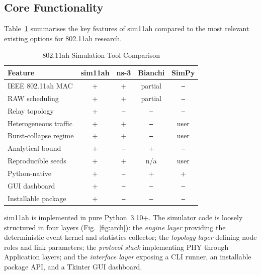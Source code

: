 \documentclass[conference]{IEEEtran}
\begin{document}
\subsection{Core Functionality}

Table~\ref{tab:comparison} summarises the key features of sim11ah compared to
the most relevant existing options for 802.11ah research.

\begin{table}[!t]
\renewcommand{\arraystretch}{1.15}
\caption{802.11ah Simulation Tool Comparison}
\label{tab:comparison}
\centering
\begin{tabular}{@{}lcccc@{}}
\toprule
\textbf{Feature} & \textbf{sim11ah} & \textbf{ns-3} & \textbf{Bianchi} & \textbf{SimPy} \\
\midrule
IEEE 802.11ah MAC    & +       & +       & partial & \texttt{--} \\
RAW scheduling       & +       & +       & partial & \texttt{--} \\
Relay topology       & +       & \texttt{--}      & \texttt{--}      & \texttt{--} \\
Heterogeneous traffic& +       & +       & \texttt{--}      & user \\
Burst-collapse regime& +       & +       & \texttt{--}      & user \\
Analytical bound     & +       & \texttt{--}      & +       & \texttt{--} \\
Reproducible seeds   & +       & +       & n/a     & user \\
Python-native        & +       & \texttt{--}      & +       & + \\
GUI dashboard        & +       & \texttt{--}      & \texttt{--}      & \texttt{--} \\
Installable package  & +       & \texttt{--}      & \texttt{--}      & \texttt{--} \\
\bottomrule
\end{tabular}
\end{table}

sim11ah is implemented in pure Python~3.10+.
The simulator code is loosely structured in four layers (Fig.~\ref{fig:arch}):
the \emph{engine layer} providing the deterministic event kernel and
statistics collector; the \emph{topology layer} defining node roles and link
parameters; the \emph{protocol stack} implementing PHY through Application
layers; and the \emph{interface layer} exposing a CLI runner, an installable
package API, and a Tkinter GUI dashboard.
\end{document}

